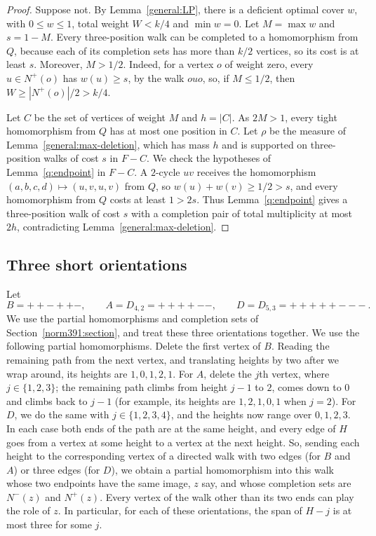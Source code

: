 \begin{proof}
Suppose not. By Lemma~\ref{general:LP}, there is a deficient optimal cover $w$, with $0\le w\le1$, total weight
$W<k/4$ and $\min w=0$.
Let $M=\max w$ and $s=1-M$. Every three-position walk can be completed
to a homomorphism from $Q$, because each of its completion sets has more than $k/2$ vertices, so its cost is at least $s$.
Moreover, $M>1/2$. Indeed, for a vertex $o$ of weight zero, every
$u\in N^+(o)$ has $w(u)\ge s$, by the walk $ouo$, so, if $M\le1/2$, then
$W\ge |N^+(o)|/2>k/4$.

Let $C$ be the set of vertices of weight $M$ and $h=|C|$. As $2M>1$, every tight homomorphism from $Q$
has at most one position in $C$. Let $\rho$ be the measure of
Lemma~\ref{general:max-deletion}, which has mass $h$ and is supported on three-position walks of cost $s$ in $F-C$.
We check the hypotheses of Lemma~\ref{q:endpoint} in $F-C$. A $2$-cycle
$uv$ receives the homomorphism $(a,b,c,d)\mapsto(u,v,u,v)$ from $Q$, so
$w(u)+w(v)\ge1/2>s$, and every homomorphism from $Q$ costs at least
$1>2s$. Thus Lemma~\ref{q:endpoint} gives a three-position walk of cost $s$ with a completion pair of total multiplicity at most $2h$, contradicting
Lemma~\ref{general:max-deletion}.
\end{proof}


\subsection{Three short orientations}\label{sec:threemixed}
Let
\[
 B=++-++-,\qquad A=D_{4,2}=++++--,\qquad D=D_{5,3}=+++++---.
\]
We use the partial homomorphisms and completion sets of
Section~\ref{norm391:section}, and treat these three orientations together.
We use the following partial homomorphisms. Delete the first vertex of $B$. Reading the remaining path from the next vertex, and translating heights by two after we wrap around, its heights are $1,0,1,2,1$. For $A$, delete the $j$th vertex, where $j\in\{1,2,3\}$; the remaining path climbs from height $j-1$ to $2$, comes down to $0$ and climbs back to $j-1$ (for example, its heights are $1,2,1,0,1$ when $j=2$). For $D$, we do the same with $j\in\{1,2,3,4\}$, and the heights now range over $0,1,2,3$.
In each case both ends of the path are at the same height, and every edge of $H$ goes from a vertex at some height to a vertex at the next height. So, sending each height to the corresponding vertex of a directed walk with two edges (for $B$ and $A$) or three edges (for $D$), we obtain a partial homomorphism into this walk whose two endpoints have the same image, $z$ say, and whose completion sets are $N^-(z)$ and $N^+(z)$. Every vertex of the walk other than its two ends can play the role of $z$.
In particular, for each of these orientations, the span of $H-j$ is at most three for some $j$.

